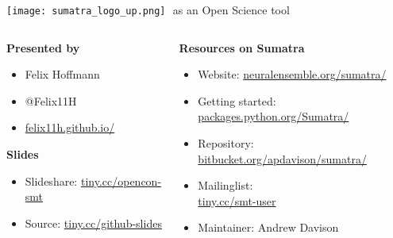 \begin{frame}
  \begin{center} 
    \Large 
    \texttt{[image: sumatra\_logo\_up.png]} 
    \textcolor{white}{-}as an Open Science tool
  \end{center}
  
  \vspace{0.35cm}

  \begin{columns}[t]
    \begin{column}{0.4\textwidth}        
      \textbf{Presented by}
      \normalsize
      \vspace{0.18cm}
      \begin{itemize}[leftmargin=0.6cm]
        \item[] Felix Hoffmann
        \item[] @Felix11H
        \item[] \href{http://felix11h.github.io/}{felix11h.github.io/}
      \end{itemize}

      \vspace{0.38cm}
      \textbf{Slides}
      \normalsize
      \vspace{0.18cm}
      \begin{itemize}[leftmargin=0.6cm]
        \item[] Slideshare: %
          \href{http://tiny.cc/opencon-smt}{tiny.cc/opencon-smt}
        \item[] Source: %
          \href{http://tiny.cc/github-slides}{tiny.cc/github-slides}
      \end{itemize}
    \end{column}
    \begin{column}{0.64\textwidth}
      \textbf{Resources on Sumatra}
      \vspace{0.28cm}
      \normalsize 
      \begin{itemize}[leftmargin=0.6cm]
        \item[] Website: %
          \href{http://neuralensemble.org/sumatra/}{%
            neuralensemble.org/sumatra/}\\
        \item[]Getting started: %
          \href{http://packages.python.org/Sumatra/}{%
            packages.python.org/Sumatra/}\\
        \item[]Repository: %
          \href{http://bitbucket.org/apdavison/sumatra/}{%
            bitbucket.org/apdavison/sumatra/}
        \item[] Mailinglist: \\%
          \href{http://tiny.cc/smt-user}{tiny.cc/smt-user}
        \item[] Maintainer: Andrew Davison 
      \end{itemize}
    \end{column}
  \end{columns}


\end{frame}
